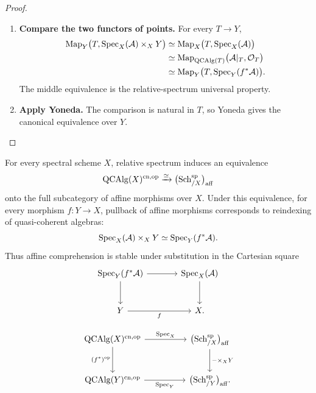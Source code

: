 \begin{proof}
\leavevmode
\begin{enumerate}[label=\textup{(\arabic*)}]
    \item \textbf{Compare the two functors of points.}
    For every \(T\to Y\),
    \[
    \begin{aligned}
        \operatorname{Map}_Y\bigl(T,\operatorname{Spec}_X(\mathcal A)\times_XY\bigr)
        &\simeq
        \operatorname{Map}_X\bigl(T,\operatorname{Spec}_X(\mathcal A)\bigr)
        \\
        &\simeq
        \operatorname{Map}_{\operatorname{QCAlg}(T)}
        \bigl(\mathcal A|_T,\mathcal O_T\bigr)
        \\
        &\simeq
        \operatorname{Map}_Y\bigl(T,\operatorname{Spec}_Y(f^*\mathcal A)\bigr).
    \end{aligned}
    \]
    The middle equivalence is the relative-spectrum universal property.

    \item \textbf{Apply Yoneda.}
    The comparison is natural in \(T\), so Yoneda gives the canonical
    equivalence over \(Y\).
\end{enumerate}
\end{proof}

\begin{theorem}
\label{thm:classification-affine-morphisms}
For every spectral scheme \(X\), relative spectrum induces an equivalence
\[
    \operatorname{QCAlg}(X)^{\mathrm{cn},\mathrm{op}}
    \xrightarrow{\simeq}
    \bigl(\operatorname{Sch}^{\mathrm{sp}}_{/X}\bigr)_{\mathrm{aff}}
\]
onto the full subcategory of affine morphisms over \(X\). Under this
equivalence, for every morphism \(f:Y\to X\), pullback of affine morphisms
corresponds to reindexing of quasi-coherent algebras:
\[
    \operatorname{Spec}_X(\mathcal A)\times_XY
    \simeq
    \operatorname{Spec}_Y(f^*\mathcal A).
\]
Thus affine comprehension is stable under substitution in the Cartesian square
\[
\begin{tikzcd}[column sep=large, row sep=large]
    \Spec_Y(f^*\mathcal A)
        \arrow[r]
        \arrow[d]
    &
    \Spec_X(\mathcal A)
        \arrow[d]
    \\
    Y
        \arrow[r, "f"']
    &
    X.
\end{tikzcd}
\]
\end{theorem}

\[
\begin{tikzcd}[column sep=huge, row sep=large]
    \operatorname{QCAlg}(X)^{\mathrm{cn},\op}
        \arrow[r, "{\Spec_X}"]
        \arrow[d, "{(f^*)^{\op}}"']
    &
    \bigl(\operatorname{Sch}^{\mathrm{sp}}_{/X}\bigr)_{\mathrm{aff}}
        \arrow[d, "{-\times_XY}"]
    \\
    \operatorname{QCAlg}(Y)^{\mathrm{cn},\op}
        \arrow[r, "{\Spec_Y}"']
    &
    \bigl(\operatorname{Sch}^{\mathrm{sp}}_{/Y}\bigr)_{\mathrm{aff}}.
\end{tikzcd}
\]

